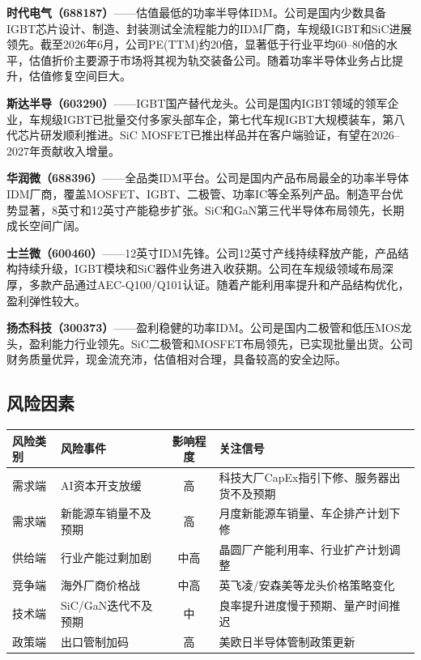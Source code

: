 \textbf{时代电气（688187）}——估值最低的功率半导体IDM。公司是国内少数具备IGBT芯片设计、制造、封装测试全流程能力的IDM厂商，车规级IGBT和SiC进展领先。截至2026年6月，公司PE(TTM)约20倍，显著低于行业平均60--80倍的水平，估值折价主要源于市场将其视为轨交装备公司。随着功率半导体业务占比提升，估值修复空间巨大。

\vspace{0.2em}

\textbf{斯达半导（603290）}——IGBT国产替代龙头。公司是国内IGBT领域的领军企业，车规级IGBT已批量交付多家头部车企，第七代车规IGBT大规模装车，第八代芯片研发顺利推进。SiC MOSFET已推出样品并在客户端验证，有望在2026--2027年贡献收入增量。

\vspace{0.2em}

\textbf{华润微（688396）}——全品类IDM平台。公司是国内产品布局最全的功率半导体IDM厂商，覆盖MOSFET、IGBT、二极管、功率IC等全系列产品。制造平台优势显著，8英寸和12英寸产能稳步扩张。SiC和GaN第三代半导体布局领先，长期成长空间广阔。

\vspace{0.2em}

\textbf{士兰微（600460）}——12英寸IDM先锋。公司12英寸产线持续释放产能，产品结构持续升级，IGBT模块和SiC器件业务进入收获期。公司在车规级领域布局深厚，多款产品通过AEC-Q100/Q101认证。随着产能利用率提升和产品结构优化，盈利弹性较大。

\vspace{0.2em}

\textbf{扬杰科技（300373）}——盈利稳健的功率IDM。公司是国内二极管和低压MOS龙头，盈利能力行业领先。SiC二极管和MOSFET布局领先，已实现批量出货。公司财务质量优异，现金流充沛，估值相对合理，具备较高的安全边际。

\subsection{风险因素}

\begin{riskbox}[功率半导体板块主要风险因素]
\small
\setlength{\aboverulesep}{0pt}
\setlength{\belowrulesep}{0pt}
\begin{tabularx}{\linewidth}{X L{2.8cm} c L{4.5cm}}
\toprule
\textbf{风险类别} & \textbf{风险事件} & \textbf{影响程度} & \textbf{关注信号} \\
\midrule
需求端 & AI资本开支放缓 & \textcolor{riskred}{高} & 科技大厂CapEx指引下修、服务器出货不及预期 \\
需求端 & 新能源车销量不及预期 & \textcolor{riskred}{高} & 月度新能源车销量、车企排产计划下修 \\
供给端 & 行业产能过剩加剧 & \textcolor{riskamber}{中高} & 晶圆厂产能利用率、行业扩产计划调整 \\
竞争端 & 海外厂商价格战 & \textcolor{riskamber}{中高} & 英飞凌/安森美等龙头价格策略变化 \\
技术端 & SiC/GaN迭代不及预期 & \textcolor{riskamber}{中} & 良率提升进度慢于预期、量产时间推迟 \\
政策端 & 出口管制加码 & \textcolor{riskred}{高} & 美欧日半导体管制政策更新 \\
\bottomrule
\end{tabularx}
\end{riskbox}

